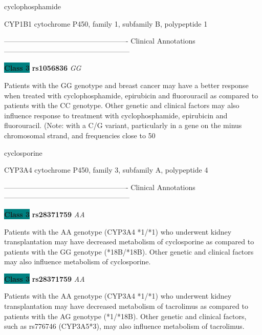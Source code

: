\documentclass{resume} %
\begin{document}
\begin{rSection}{ cyclophosphamide }
\begin{rSubsection}{ CYP1B1 }{ cytochrome P450, family 1, subfamily B, polypeptide 1 }{}{}
\item[] ---------------------------------------------------- Clinical Annotations -----------------------------------------------------\newline
\item \textbf{\colorbox{teal} {Class 3}} \textbf{ rs1056836 } \textit{ GG }
\item[] Patients with the GG genotype and breast cancer may have a better response when treated with cyclophosphamide, epirubicin and fluorouracil as compared to patients with the CC genotype. Other genetic and clinical factors may also influence response to treatment with cyclophosphamide, epirubicin and fluorouracil.  (Note: with a C/G variant, particularly in a gene on the minus chromosomal strand, and frequencies close to 50%
\end{rSubsection}

\end{rSection}\begin{rSection}{ cyclosporine }
\item[]

\begin{rSubsection}{ CYP3A4 }{ cytochrome P450, family 3, subfamily A, polypeptide 4 }{}{}
\item[]

\item[] ---------------------------------------------------- Clinical Annotations -----------------------------------------------------\newline
\item \textbf{\colorbox{teal} {Class 3}} \textbf{ rs28371759 } \textit{ AA }
\item[] Patients with the AA genotype (CYP3A4 *1/*1) who underwent kidney transplantation may have decreased metabolism of cyclosporine as compared to patients with the GG genotype (*18B/*18B). Other genetic and clinical factors may also influence metabolism of cyclosporine.\item \textbf{\colorbox{teal} {Class 3}} \textbf{ rs28371759 } \textit{ AA }
\item[] Patients with the AA genotype (CYP3A4 *1/*1) who underwent kidney transplantation may have decreased metabolism of tacrolimus as compared to patients with the AG genotype (*1/*18B). Other genetic and clinical factors, such as rs776746 (CYP3A5*3), may also influence metabolism of tacrolimus.
\end{rSubsection}


\end{rSection}
\end{document}
